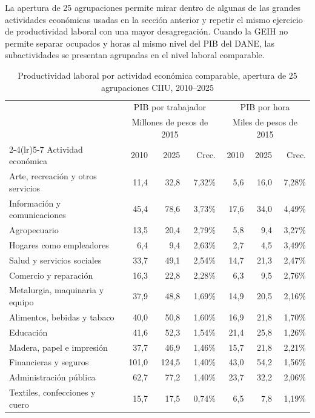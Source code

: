 La apertura de 25 agrupaciones permite mirar dentro de algunas de las grandes actividades económicas usadas en la sección anterior y repetir el mismo ejercicio de productividad laboral con una mayor desagregación. Cuando la GEIH no permite separar ocupados y horas al mismo nivel del PIB del DANE, las subactividades se presentan agrupadas en el nivel laboral comparable.

\begin{table}[H]
\centering
\caption{Productividad laboral por actividad económica comparable, apertura de 25 agrupaciones CIIU, 2010--2025}
\label{tab:pib_geih_productividad_25}
\footnotesize
\begin{tabular}{p{}rrrrrr}
\toprule
& \multicolumn{3}{c}{PIB por trabajador} & \multicolumn{3}{c}{PIB por hora} \\
& \multicolumn{3}{c}{\footnotesize Millones de pesos de 2015} & \multicolumn{3}{c}{\footnotesize Miles de pesos de 2015} \\
\cmidrule(lr){2-4}\cmidrule(lr){5-7}
Actividad económica & 2010 & 2025 & Crec. & 2010 & 2025 & Crec. \\
\midrule
Arte, recreación y otros servicios & 11,4 & 32,8 & 7,32\% & 5,6 & 16,0 & 7,28\% \\
Información y comunicaciones & 45,4 & 78,6 & 3,73\% & 17,6 & 34,0 & 4,49\% \\
Agropecuario & 13,5 & 20,4 & 2,79\% & 5,8 & 9,4 & 3,27\% \\
Hogares como empleadores & 6,4 & 9,4 & 2,63\% & 2,7 & 4,5 & 3,49\% \\
Salud y servicios sociales & 33,7 & 49,1 & 2,54\% & 14,7 & 21,3 & 2,47\% \\
Comercio y reparación & 16,3 & 22,8 & 2,28\% & 6,3 & 9,5 & 2,76\% \\
Metalurgia, maquinaria y equipo & 37,9 & 48,8 & 1,69\% & 14,9 & 20,5 & 2,16\% \\
Alimentos, bebidas y tabaco & 40,0 & 50,8 & 1,60\% & 16,9 & 21,8 & 1,70\% \\
Educación & 41,6 & 52,3 & 1,54\% & 21,4 & 25,8 & 1,26\% \\
Madera, papel e impresión & 37,7 & 46,9 & 1,46\% & 15,7 & 21,8 & 2,21\% \\
Financieras y seguros & 101,0 & 124,5 & 1,40\% & 43,0 & 54,2 & 1,56\% \\
Administración pública & 62,7 & 77,2 & 1,40\% & 23,7 & 32,2 & 2,06\% \\
Textiles, confecciones y cuero & 15,7 & 17,5 & 0,74\% & 6,5 & 7,8 & 1,19\% \\

\end{tabular}
\end{table}
